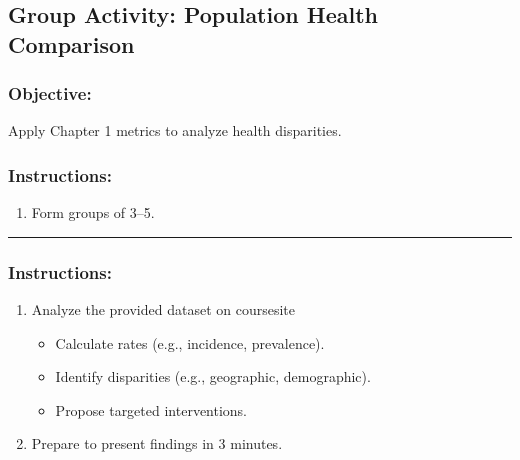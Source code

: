 \documentclass[
  letterpaper,
  DIV=11,
  numbers=noendperiod]{scrartcl}
\providecommand{\tightlist}{%
  \setlength{\itemsep}{0pt}\setlength{\parskip}{0pt}}\usepackage{longtable,booktabs,array}
\begin{document}
\hypertarget{group-activity-population-health-comparison}{%
\subsection{\texorpdfstring{{\textbf{Group Activity: Population Health
Comparison}}}{Group Activity: Population Health Comparison}}\label{group-activity-population-health-comparison}}

\hypertarget{objective}{%
\subsubsection{\texorpdfstring{{\textbf{Objective}}:}{Objective:}}\label{objective}}

Apply Chapter 1 metrics to analyze health disparities.

\hypertarget{instructions}{%
\subsubsection{\texorpdfstring{{\textbf{Instructions}}:}{Instructions:}}\label{instructions}}

\begin{enumerate}
\def\labelenumi{\arabic{enumi}.}
\tightlist
\item
  Form groups of 3--5.\\
\end{enumerate}

\begin{center}\rule{0.5\linewidth}{0.5pt}\end{center}

\hypertarget{instructions-1}{%
\subsubsection{\texorpdfstring{{\textbf{Instructions}}:}{Instructions:}}\label{instructions-1}}

\begin{enumerate}
\def\labelenumi{\arabic{enumi}.}
\setcounter{enumi}{1}
\tightlist
\item
  Analyze the provided dataset on coursesite

  \begin{itemize}
  \tightlist
  \item
    Calculate rates (e.g., incidence, prevalence).\\
  \item
    Identify disparities (e.g., geographic, demographic).\\
  \item
    Propose targeted interventions.
  \end{itemize}
\item
  Prepare to present findings in 3 minutes.
\end{enumerate}
\end{document}
